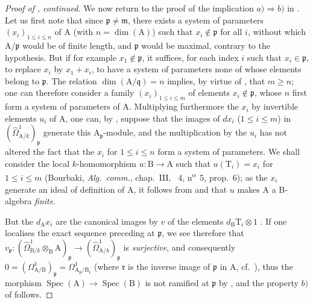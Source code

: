 \begin{proof}[Proof of {}, continued]
We now return to the proof of the implication $a)\Rightarrow b)$ in .
Let us first note that since $\mathfrak{p}\neq\mathfrak{m}$, there exists a system of parameters $(x_i)_{1\leq i\leq n}$ of $\mathrm{A}$ (with $n=\dim(\mathrm{A})$) such that $x_i\notin\mathfrak{p}$ for all $i$, without which $\mathrm{A}/\mathfrak{p}$ would be of finite length, and $\mathfrak{p}$ would be maximal, contrary to the hypothesis.
But if for example $x_1\notin\mathfrak{p}$, it suffices, for each index $i$ such that $x_i\in\mathfrak{p}$, to replace $x_i$ by $x_1+x_i$, to have a system of parameters none of whose elements belong to $\mathfrak{p}$.
The relation $\dim(\mathrm{A}/\mathfrak{q})=n$ implies, by virtue of , that $m\geq n$; one can therefore consider a family $(x_i)_{1\leq i\leq m}$ of elements $x_i\notin\mathfrak{p}$, whose $n$ first form a system of parameters of $\mathrm{A}$.
Multiplying furthermore the $x_i$ by invertible elements $u_i$ of $\mathrm{A}$, one can, by , suppose that the images of $dx_i$ ($1\leq i\leq m$) in $(\hat{\Omega}^1_{\mathrm{A}/k})_\mathfrak{p}$ generate this $\mathrm{A}_\mathfrak{p}$-module, and the multiplication by the $u_i$ has not altered the fact that the $x_i$ for $1\leq i\leq n$ form a system of parameters.
We shall consider the local $k$-homomorphism $u:\mathrm{B}\to\mathrm{A}$ such that $u(\mathrm{T}_i)=x_i$ for $1\leq i\leq m$ (Bourbaki, \emph{Alg.\ comm.}, chap.~III, \textsection~4, n\textsuperscript{o}~5, prop.~6); as the $x_i$ generate an ideal of definition of $\mathrm{A}$, it follows from  and  that $u$ makes $\mathrm{A}$ a $\mathrm{B}$-algebra \emph{finite}.

But the $d_\mathrm{A}x_i$ are the canonical images by $v$ of the elements $d_\mathrm{B}\mathrm{T}_i\otimes 1$ .
If one localises the exact sequence preceding at $\mathfrak{p}$, we see therefore that $v_\mathfrak{p}:(\hat{\Omega}^1_{\mathrm{B}/k}\otimes_\mathrm{B}\mathrm{A})_\mathfrak{p}\to(\hat{\Omega}^1_{\mathrm{A}/k})_\mathfrak{p}$ is \emph{surjective}, and consequently $0=(\Omega^1_{\mathrm{A}/\mathrm{B}})_\mathfrak{p}=\Omega^1_{\mathrm{A}_\mathfrak{p}/\mathrm{B}_\mathfrak{r}}$ (where $\mathfrak{r}$ is the inverse image of $\mathfrak{p}$ in $\mathrm{A}$, cf.\ ), thus the morphism $\operatorname{Spec}(\mathrm{A})\to\operatorname{Spec}(\mathrm{B})$ is not ramified at $\mathfrak{p}$ by , and the property $b)$ of  follows.
\end{proof}

